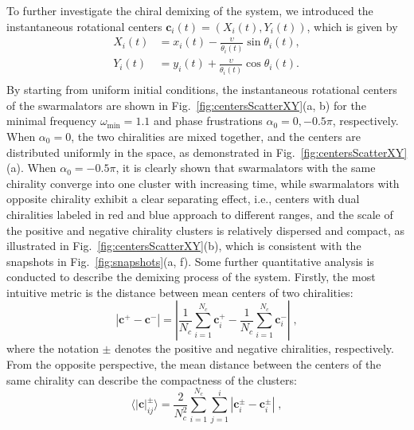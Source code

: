 \documentclass{article}
\begin{document}
To further investigate the chiral demixing of the system, we introduced the instantaneous rotational centers $\mathbf{c}_i\left(t\right)=\left(X_i\left(t\right), Y_i\left(t\right)\right)$, which is given by
\begin{equation}
    \begin{aligned}
        X_i\left( t \right) &=x_i\left( t \right) -\frac{\upsilon}{\dot{\theta}_i\left( t \right)}\sin \theta _i\left( t \right) ,\\
        Y_i\left( t \right) &=y_i\left( t \right) +\frac{\upsilon}{\dot{\theta}_i\left( t \right)}\cos \theta _i\left( t \right) .\\
    \end{aligned}
\end{equation}
By starting from uniform initial conditions, the instantaneous rotational centers of the swarmalators are shown in Fig.~\ref{fig:centersScatterXY}(a, b) for the minimal frequency $\omega_{\min}=1.1$ and phase frustrations $\alpha_0=0, -0.5\pi$, respectively.
When $\alpha_0=0$, the two chiralities are mixed together, and the centers are distributed uniformly in the space, as demonstrated in Fig.~\ref{fig:centersScatterXY}(a). 
When $\alpha_0=-0.5\pi$, it is clearly shown that swarmalators with the same chirality converge into one cluster with increasing time, while swarmalators with opposite chirality exhibit a clear separating effect, i.e., centers with dual chiralities labeled in red and blue approach to different ranges, and the scale of the positive and negative chirality clusters is relatively dispersed and compact, as illustrated in Fig.~\ref{fig:centersScatterXY}(b), which is consistent with the snapshots in Fig.~\ref{fig:snapshots}(a, f).
Some further quantitative analysis is conducted to describe the demixing process of the system. Firstly, the most intuitive metric is the distance between mean centers of two chiralities:
\begin{equation}
    \left| \mathbf{c}^+-\mathbf{c}^- \right|=\left| \frac{1}{N_c}\sum_{i=1}^{N_c}{\mathbf{c}_{i}^{+}}-\frac{1}{N_c}\sum_{i=1}^{N_c}{\mathbf{c}_{i}^{-}} \right|\;,
\end{equation}
where the notation $\pm$ denotes the positive and negative chiralities, respectively. From the opposite perspective, the mean distance between the centers of the same chirality can describe the compactness of the clusters:
\begin{equation}
     \langle \left| \mathbf{c} \right|_{ij}^{\pm} \rangle =\frac{2}{N_{c}^{2}}\sum_{i=1}^{N_c}{\sum_{j=1}^i{\left| \mathbf{c}_{i}^{\pm}-\mathbf{c}_{i}^{\pm} \right|}}\;,
\end{equation}
\end{document}
